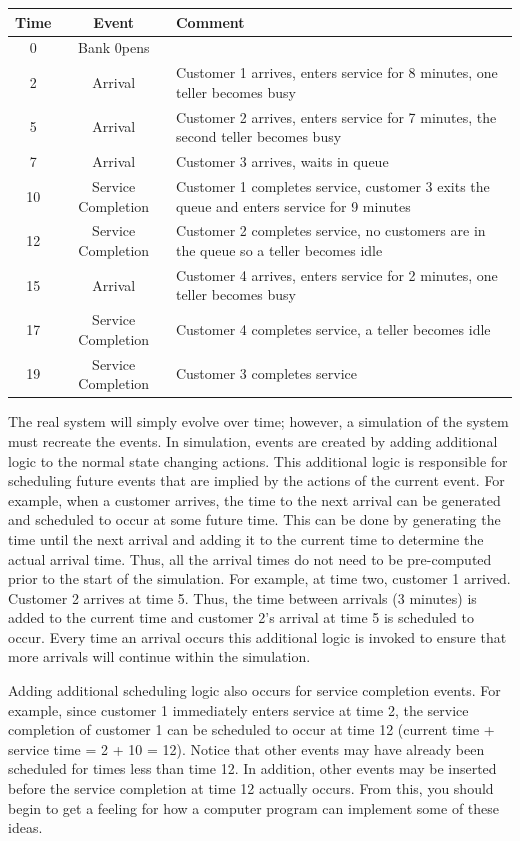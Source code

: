 \documentclass[
]{book}
\theoremstyle{definition}
\theoremstyle{definition}
\theoremstyle{definition}
\theoremstyle{definition}
\theoremstyle{remark}
\begin{document}
\begin{longtable}[]{@{}ccl@{}}
\toprule
Time & Event & Comment \\
\midrule
\endhead
0 & Bank 0pens & \\
2 & Arrival & Customer 1 arrives, enters service for 8 minutes, one teller becomes busy \\
5 & Arrival & Customer 2 arrives, enters service for 7 minutes, the second teller becomes busy \\
7 & Arrival & Customer 3 arrives, waits in queue \\
10 & Service Completion & Customer 1 completes service, customer 3 exits the queue and enters service for 9 minutes \\
12 & Service Completion & Customer 2 completes service, no customers are in the queue so a teller becomes idle \\
15 & Arrival & Customer 4 arrives, enters service for 2 minutes, one teller becomes busy \\
17 & Service Completion & Customer 4 completes service, a teller becomes idle \\
19 & Service Completion & Customer 3 completes service \\
\bottomrule
\end{longtable}

\hfill\break

The real system will simply evolve over time; however, a simulation of
the system must recreate the events. In simulation, events are created
by adding additional logic to the normal state changing actions. This
additional logic is responsible for scheduling future events that are
implied by the actions of the current event. For example, when a
customer arrives, the time to the next arrival can be generated and
scheduled to occur at some future time. This can be done by generating
the time until the next arrival and adding it to the current time to
determine the actual arrival time. Thus, all the arrival times do not
need to be pre-computed prior to the start of the simulation. For
example, at time two, customer 1 arrived. Customer 2 arrives at time 5.
Thus, the time between arrivals (3 minutes) is added to the current time
and customer 2's arrival at time 5 is scheduled to occur. Every time an
arrival occurs this additional logic is invoked to ensure that more
arrivals will continue within the simulation.

Adding additional scheduling logic also occurs for service completion
events. For example, since customer 1 immediately enters service at time
2, the service completion of customer 1 can be scheduled to occur at
time 12 (current time + service time = 2 + 10 = 12). Notice that other
events may have already been scheduled for times less than time 12. In
addition, other events may be inserted before the service completion at
time 12 actually occurs. From this, you should begin to get a feeling
for how a computer program can implement some of these ideas.
\end{document}
